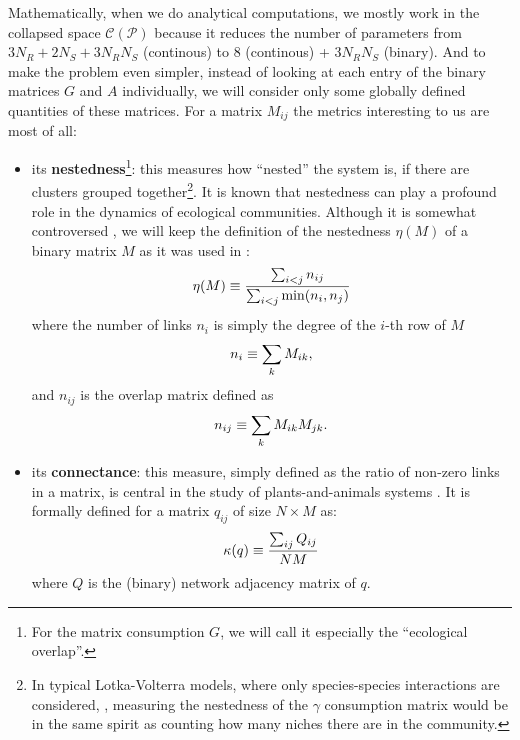 \documentclass[12pt, titlepage]{report}
\begin{document}
Mathematically, when we do analytical computations, we mostly work in the collapsed space $\mathcal{C}(\mathcal{P})$ because it reduces the number of parameters from $3N_R+2N_S+3N_RN_S$ (continous) to $8$ (continous) + $3N_RN_S$ (binary). And to make the problem even simpler, instead of looking at each entry of the binary matrices $G$ and $A$ individually, we will consider only some globally defined quantities of these matrices. For a matrix $M_{ij}$ the metrics interesting to us are most of all:
\begin{itemize}
\item its \textbf{nestedness}\footnote{For the matrix consumption $G$, we will call it especially the ``ecological overlap''.}: this measures how ``nested'' the system is, \ie if there are clusters grouped together\footnote{In typical Lotka-Volterra models, where only species-species interactions are considered, \eg \cite{iannelli_introduction_2014}, measuring the nestedness of the $\gamma$ consumption matrix would be in the same spirit as counting how many niches there are in the community.}. It is known \cite{bastolla_architecture_2009, pascual-garcia_mutualism_2017} that nestedness can play a profound role in the dynamics of ecological communities. Although it is somewhat controversed \cite{jonhson_factors_2013}, we will keep the definition of the nestedness $\eta(M)$ of a binary matrix $M$ as it was used in \cite{bastolla_architecture_2009}:
\begin{equation}
\eta(M)\equiv \frac{\sum_{i<j} n_{ij}}{\sum_{i < j} \min(n_i, n_j)}
\end{equation}
where the number of links $n_i$ is simply the degree of the $i$-th row of $M$
\begin{equation}
n_i \equiv \sum_k M_{ik},
\end{equation}
and $n_{ij}$ is the overlap matrix defined as
\begin{equation}
n_{ij}\equiv \sum_k M_{ik}M_{jk}.
\end{equation}

\item its \textbf{connectance}: this measure, simply defined as the ratio of non-zero links in a matrix, is central in the study of plants-and-animals systems \cite{pascual-garcia_mutualism_2017}. It is formally defined for a matrix $q_{ij}$  of size $N\times M$ as:
\begin{equation}
\kappa(q)\equiv \frac{\sum_{ij} Q_{ij}}{NM}
\end{equation}
where $Q$ is the (binary) network adjacency matrix of $q$.
\end{itemize}
\end{document}
